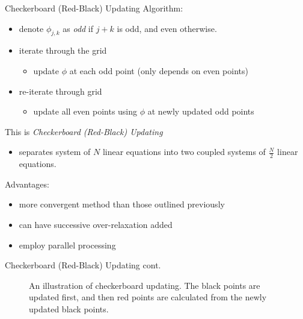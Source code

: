 \documentclass{beamer}
\begin{document}
\begin{frame}{Checkerboard (Red-Black) Updating}
Algorithm:
\begin{itemize}
\item denote $\phi_{j,k}$ as \emph{odd} if $j+k$ is odd, and even otherwise.
\item iterate through the grid
 \begin{itemize}
 \item update $\phi$ at each odd point (only depends on even points)
 \end{itemize}
\item re-iterate through grid
 \begin{itemize}
 \item update all even points using $\phi$ at newly updated odd points
 \end{itemize}
\end{itemize}

This is \emph{Checkerboard (Red-Black) Updating}
\begin{itemize}
\item separates system of $N$ linear equations into two coupled systems of
$\frac{N}{2}$ linear equations.
\end{itemize}

Advantages:
\begin{itemize}
\item more convergent method than those outlined previously
\item can have successive over-relaxation added
\item employ parallel processing
\end{itemize}

\end{frame}

\begin{frame}{Checkerboard (Red-Black) Updating cont.}
\begin{figure}[h!]
\begin{center}
\end{center}
\caption{An illustration of checkerboard updating. The black points are updated first,
and then red points are calculated from the newly updated black points.}
\label{fig:checker}
\end{figure}

\end{frame}
\end{document}

